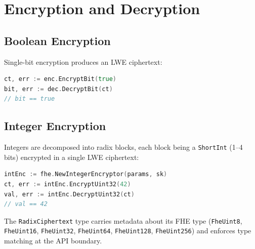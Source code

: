\section{Encryption and Decryption}


\subsection{Boolean Encryption}

Single-bit encryption produces an LWE ciphertext:

\begin{lstlisting}[language=Go]
ct, err := enc.EncryptBit(true)
bit, err := dec.DecryptBit(ct)
// bit == true
\end{lstlisting}

\subsection{Integer Encryption}

Integers are decomposed into radix blocks, each block being a \texttt{ShortInt} (1--4 bits) encrypted in a single LWE ciphertext:

\begin{lstlisting}[language=Go]
intEnc := fhe.NewIntegerEncryptor(params, sk)
ct, err := intEnc.EncryptUint32(42)
val, err := intEnc.DecryptUint32(ct)
// val == 42
\end{lstlisting}

The \texttt{RadixCiphertext} type carries metadata about its FHE type (\texttt{FheUint8}, \texttt{FheUint16}, \texttt{FheUint32}, \texttt{FheUint64}, \texttt{FheUint128}, \texttt{FheUint256}) and enforces type matching at the API boundary.

